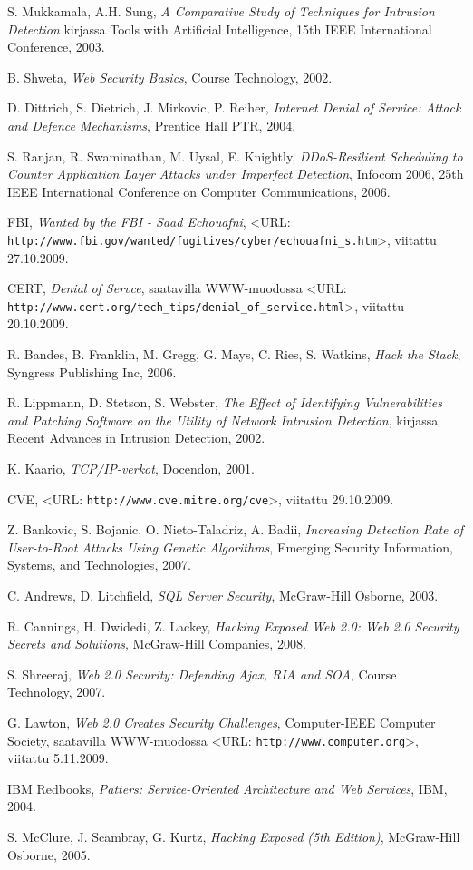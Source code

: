 \begin{thebibliography}{99}

S. Mukkamala, A.H. Sung, \textit{A Comparative Study of Techniques for Intrusion Detection} kirjassa Tools with Artificial Intelligence, 
15th IEEE International Conference, 2003.

B. Shweta, \textit{Web Security Basics}, Course Technology, 2002.

D. Dittrich, S. Dietrich, J. Mirkovic, P. Reiher, \textit{Internet Denial of Service: Attack and Defence Mechanisms}, Prentice Hall PTR, 2004.

S. Ranjan, R. Swaminathan, M. Uysal, E. Knightly, \textit{DDoS-Resilient Scheduling to Counter Application Layer Attacks under Imperfect Detection},
Infocom 2006, 25th IEEE International Conference on Computer Communications, 2006.

FBI, \textit{Wanted by the FBI - Saad Echouafni}, <URL: \texttt{http://www.fbi.gov/wanted/fugitives/cyber/echouafni\_s.htm}>, viitattu 27.10.2009.

CERT, \textit{Denial of Servce}, saatavilla WWW-muodossa <URL: \texttt{http://www.cert.org/tech\_tips/denial\_of\_service.html}>, viitattu 20.10.2009.

R. Bandes, B. Franklin, M. Gregg, G. Mays, C. Ries, S. Watkins, \textit{Hack the Stack}, Syngress Publishing Inc, 2006. 

R. Lippmann, D. Stetson, S. Webster, \textit{The Effect of Identifying Vulnerabilities and Patching Software on the Utility of Network Intrusion Detection},
kirjassa Recent Advances in Intrusion Detection, 2002.

K. Kaario, \textit{TCP/IP-verkot}, Docendon, 2001.

CVE, <URL: \texttt{http://www.cve.mitre.org/cve}>, viitattu 29.10.2009.

Z. Bankovic, S. Bojanic, O. Nieto-Taladriz, A. Badii, \textit{Increasing Detection Rate of User-to-Root Attacks Using Genetic Algorithms}, 
Emerging Security Information, Systems, and Technologies, 2007.

C. Andrews, D. Litchfield, \textit{SQL Server Security}, McGraw-Hill Osborne, 2003.

R. Cannings, H. Dwidedi, Z. Lackey, \textit{Hacking Exposed Web 2.0: Web 2.0 Security Secrets and Solutions}, McGraw-Hill Companies, 2008.

S. Shreeraj, \textit{Web 2.0 Security: Defending Ajax, RIA and SOA}, Course Technology, 2007.

G. Lawton, \textit{Web 2.0 Creates Security Challenges}, Computer-IEEE Computer Society, saatavilla WWW-muodossa <URL: \texttt{http://www.computer.org}>,
viitattu 5.11.2009.

IBM Redbooks, \textit{Patters: Service-Oriented Architecture and Web Services}, IBM, 2004.

S. McClure, J. Scambray, G. Kurtz, \textit{Hacking Exposed (5th Edition)}, McGraw-Hill Osborne, 2005.

\end{thebibliography}
